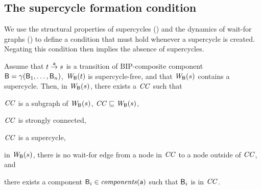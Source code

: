 


\subsection{The supercycle formation condition}

We use the structural properties of supercycles () and the dynamics of wait-for graphs ()
to define a condition that must hold whenever a supercycle is created. Negating this condition then implies the absence of supercycles.


\begin{proposition} \label{prop:supercycle-formation}
Assume that $t \goesto[\act] s$ is a transition of BIP-composite component $\B = \gamma(\B_1,\ldots,\B_n)$,
$\wfg{\B}{t}$ is supercycle-free, and that $\wfg{\B}{s}$ contains a supercycle.  Then, in $\wfg{\B}{s}$, there exists a $\CC$ such that
\bn
\item $\CC$ is a subgraph of $\wfg{\B}{s}$, \ie $\CC \subg \wfg{\B}{s}$,
\item $\CC$ is strongly connected,
\item $\CC$ is a supercycle,
\item  in $\wfg{\B}{s}$, there is no wait-for edge from a node in $\CC$ to a node outside of $\CC$, and
\item there exists a component $\B_i \in \cmps{\act}$ such that $\B_i$ is in $\CC$.
\en
\end{proposition}
%
